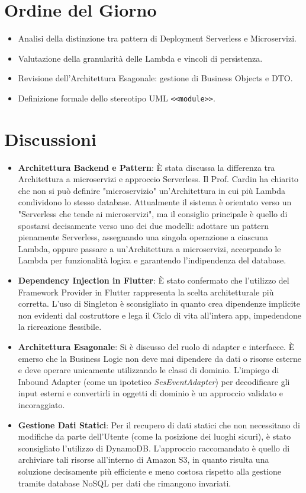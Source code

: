 \documentclass[a4paper,12pt]{article}
\begin{document}
\section{Ordine del Giorno}
\begin{itemize}
    \item Analisi della distinzione tra pattern di Deployment Serverless e Microservizi.
    \item Valutazione della granularità delle Lambda e vincoli di persistenza.
    \item Revisione dell'Architettura Esagonale: gestione di Business Objects e DTO.
    \item Definizione formale dello stereotipo UML \texttt{<<module>>}.
\end{itemize}

\section{Discussioni}
\begin{itemize}
    \item \textbf{Architettura Backend e Pattern}: È stata discussa la differenza tra Architettura a microservizi e approccio Serverless. Il Prof. Cardin ha chiarito che non si può definire "microservizio" un'Architettura in cui più Lambda condividono lo stesso database. Attualmente il sistema è orientato verso un "Serverless che tende ai microservizi", ma il consiglio principale è quello di spostarsi decisamente verso uno dei due modelli: adottare un pattern pienamente Serverless, assegnando una singola operazione a ciascuna Lambda, oppure passare a un'Architettura a microservizi, accorpando le Lambda per funzionalità logica e garantendo l'indipendenza del database.
    \item \textbf{Dependency Injection in Flutter}: È stato confermato che l'utilizzo del Framework Provider in Flutter rappresenta la scelta architetturale più corretta. L'uso di Singleton è sconsigliato in quanto crea dipendenze implicite non evidenti dal costruttore e lega il Ciclo di vita all'intera app, impedendone la ricreazione flessibile.
    \item \textbf{Architettura Esagonale}: Si è discusso del ruolo di adapter e interfacce. È emerso che la Business Logic non deve mai dipendere da dati o risorse esterne e deve operare unicamente utilizzando le classi di dominio. L'impiego di Inbound Adapter (come un ipotetico \textit{SesEventAdapter}) per decodificare gli input esterni e convertirli in oggetti di dominio è un approccio validato e incoraggiato.
    \item \textbf{Gestione Dati Statici}: Per il recupero di dati statici che non necessitano di modifiche da parte dell'Utente (come la posizione dei luoghi sicuri), è stato sconsigliato l'utilizzo di DynamoDB. L'approccio raccomandato è quello di archiviare tali risorse all'interno di Amazon S3, in quanto risulta una soluzione decisamente più efficiente e meno costosa rispetto alla gestione tramite database NoSQL per dati che rimangono invariati.
\end{itemize}
\end{document}

